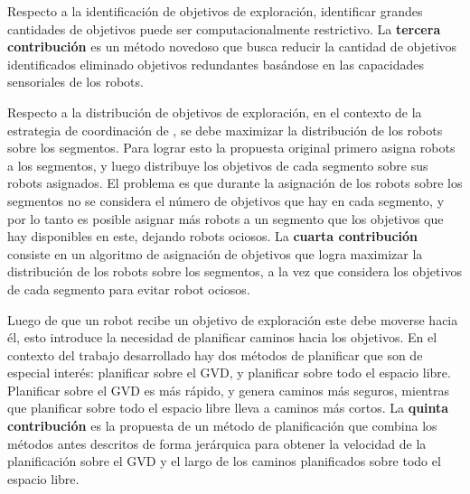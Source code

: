 Respecto a la identificación de objetivos de exploración, identificar grandes
cantidades de objetivos puede ser computacionalmente restrictivo. La
\textbf{tercera contribución} es un método novedoso que busca reducir la
cantidad de objetivos identificados eliminado objetivos redundantes basándose
en las capacidades sensoriales de los robots. 

Respecto a la distribución de objetivos de exploración, en el contexto de la
estrategia de coordinación de \cite{wurm2008coordinated}, se debe maximizar la
distribución de los robots sobre los segmentos. Para lograr esto la propuesta
original primero asigna robots a los segmentos, y luego distribuye los
objetivos de cada segmento sobre sus robots asignados. El problema es que
durante la asignación de los robots sobre los segmentos no se considera el
número de objetivos que hay en cada segmento, y por lo tanto es posible
asignar más robots a un segmento que los objetivos que hay disponibles en este,
dejando robots ociosos. La \textbf{cuarta contribución} consiste en un
algoritmo de asignación de objetivos que logra maximizar la distribución de los
robots sobre los segmentos, a la vez que considera los objetivos de cada
segmento para evitar robot ociosos.

Luego de que un robot recibe un objetivo de exploración este debe moverse hacia
él, esto introduce la necesidad de planificar caminos hacia los objetivos. En el
contexto del trabajo desarrollado hay dos métodos de planificar que son de
especial interés: planificar sobre el GVD, y planificar sobre todo el espacio
libre. Planificar sobre el GVD es más rápido, y genera caminos más
seguros, mientras que  planificar sobre todo el espacio libre lleva a caminos más
cortos. La \textbf{quinta contribución} es la propuesta de un método de planificación
que combina los métodos antes descritos de forma jerárquica para obtener la
velocidad de la planificación sobre el GVD y el largo de los caminos
planificados sobre todo el espacio libre.





